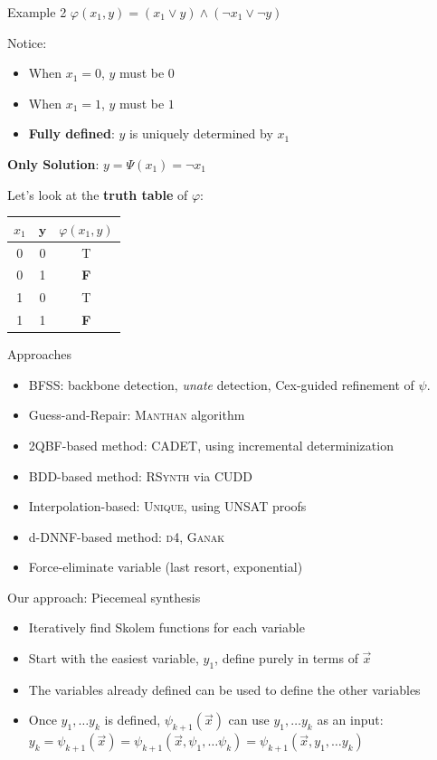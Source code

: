 \documentclass[aspectratio=169]{beamer}
\begin{document}
\begin{frame}{Example 2}
$\varphi(x_1, y) = (x_1 \lor y) \land (\neg x_1 \lor \neg y)$
\bigskip

Notice:
\begin{itemize}
    \item When $x_1 = 0$, $y$ must be $0$
    \item When $x_1 = 1$, $y$ must be $1$
    \item \textbf{Fully defined}: $y$ is uniquely determined by $x_1$
\end{itemize}
\bigskip

\textbf{Only Solution}: $y = \Psi(x_1) = \neg x_1$
\bigskip

Let's look at the \textbf{truth table} of \(\varphi\):
\begin{tabular}{|c|c|c|}
    \hline
    $x_1$ & $\mathbf{y}$ & $\varphi(x_1, y)$ \\
    \hline
    0 & 0 & T\\
    0 & 1 & \textbf{F}\\
    1 & 0 & T\\
    1 & 1 & \textbf{F}\\
    \hline
\end{tabular}
\end{frame}

\begin{frame}{Approaches}
\begin{itemize}
    \item BFSS: backbone detection, \emph{unate} detection,
        Cex-guided refinement of $\psi$.
    \item Guess-and-Repair: \textsc{Manthan} algorithm
    \item 2QBF-based method: \textsc{CADET}, using incremental determinization
    \item BDD-based method: \textsc{RSynth} via \textsc{CUDD}
    \item Interpolation-based: \textsc{Unique}, using UNSAT proofs
    \item d-DNNF-based method: \textsc{d4}, \textsc{Ganak}
    \item Force-eliminate variable (last resort, exponential)
\end{itemize}
\end{frame}

\begin{frame}{Our approach: Piecemeal synthesis}
\begin{itemize}
    \item Iteratively find Skolem functions for each variable
    \item Start with the easiest variable, $y_1$, define purely in terms of $\vec{x}$
    \item The variables already defined can be used to define the other variables
    \item Once $y_1, \ldots y_k$ is defined, $\psi_{k+1}(\vec{x})$ can use $y_1,\ldots y_k$ as an input:
        $y_k=\psi_{k+1}(\vec{x}) =
        \psi_{k+1}(\vec{x}, \psi_1, \ldots \psi_k) =
        \psi_{k+1}(\vec{x}, y_1, \ldots y_k)$
\end{itemize}
\bigskip

\end{frame}
\end{document}
